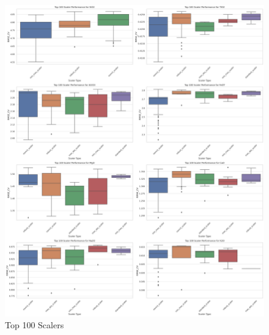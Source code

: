 \begin{figure}
    \centering
    \includegraphics[width=\textwidth]{images/top100/scalers.png}
    \caption{Top 100 Scalers}
    \label{fig:top100_scalers}
\end{figure}

